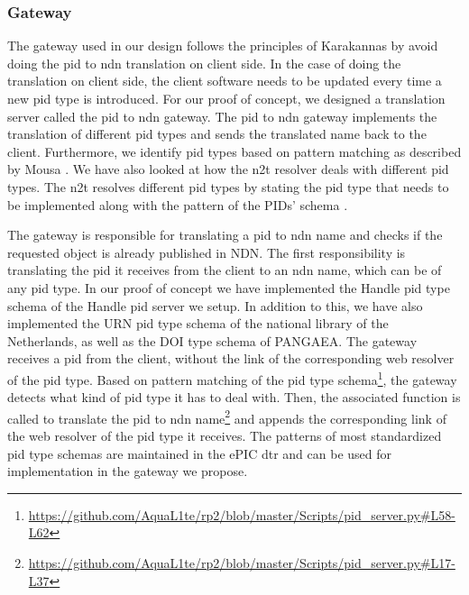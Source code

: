 \subsubsection{Gateway}\label{gw}
The gateway used in our design follows the principles of Karakannas by avoid doing the \gls{pid} to \gls{ndn} translation on client side. In the case of doing the translation on client side, the client software needs to be updated every time a new \gls{pid} type is introduced. For our proof of concept, we designed a translation server called the \gls{pid} to \gls{ndn} gateway. The \gls{pid} to \gls{ndn} gateway implements the translation of different \gls{pid} types and sends the translated name back to the client. Furthermore, we identify \gls{pid} types based on pattern matching as described by Mousa \cite{ndn-app-aware}. We have also looked at how the \gls{n2t} resolver deals with different \gls{pid} types. The \gls{n2t} resolves different \gls{pid} types by stating the \gls{pid} type that needs to be implemented along with the pattern of the PIDs' schema \cite{n2t}.

The gateway is responsible for translating a \gls{pid} to \gls{ndn} name and checks if the requested object is already published in NDN. 
The first responsibility is translating the \gls{pid} it receives from the client to an \gls{ndn} name, which can be of any \gls{pid} type. In our proof of concept we have implemented the Handle \gls{pid} type schema of the Handle \gls{pid} server we setup. In addition to this, we have also implemented the URN \gls{pid} type schema of the national library of the Netherlands, as well as the DOI type schema of PANGAEA. The gateway receives a \gls{pid} from the client, without the link of the corresponding web resolver of the \gls{pid} type. Based on pattern matching of the \gls{pid} type schema\footnote{\url{https://github.com/AquaL1te/rp2/blob/master/Scripts/pid_server.py\#L58-L62}}, the gateway detects what kind of \gls{pid} type it has to deal with. Then, the associated function is called to translate the \gls{pid} to \gls{ndn} name\footnote{\url{https://github.com/AquaL1te/rp2/blob/master/Scripts/pid_server.py\#L17-L37}} and appends the corresponding link of the web resolver of the \gls{pid} type it receives. 
The patterns of most standardized \gls{pid} type schemas are maintained in the ePIC \gls{dtr} \cite{dtr} and can be used for implementation in the gateway we propose. 

